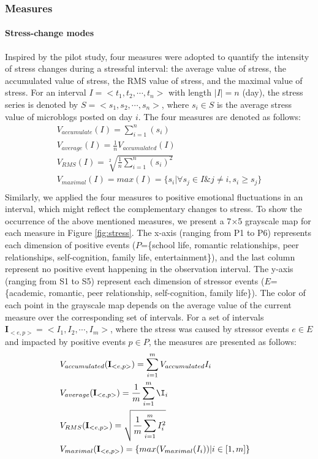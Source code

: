 \subsubsection{Measures}
\label{subsubM}
\paragraph{\textbf{Stress-change modes}}
Inspired by the pilot study,
four measures were adopted to quantify the intensity of stress changes during a stressful interval:
the average value of stress,
the accumulated value of stress,
the RMS value of stress, and the maximal value of stress.
For an interval $I=<t_1,t_2,\cdots,t_n>$ with length $|I|=n$ (day),
the stress series is denoted by $S=<s_1,s_2,\cdots,s_n>$,
where $s_i \in S$ is the average stress value of microblogs posted on day $i$.
The four measures are denoted as follows:
\begin{equation}
\begin{aligned}
&V_{accumulate}(I)= \sum_{i=1}^{n}(s_i)&\\
&V_{average}(I)= \frac{1}{n}V_{accumulated}(I)&\\
&V_{RMS}(I) = \sqrt[2]{ \frac{1}{n}\sum_{i=1}^{n}{(s_i)^2}}&\\
&V_{maximal}(I) = max(I) = \{s_i |\forall s_j \in I \& j \neq i, s_i \geq s_j\}&\\
 \end{aligned}
 \end{equation}
Similarly,
we applied the four measures to positive emotional fluctuations in an interval,
which might reflect the complementary changes to stress.
To show the occurrence of the above mentioned measures,
we present a 7$\times$5 grayscale map for each measure in Figure \ref{fig:stress}.
The x-axis (ranging from P1 to P6) represents each dimension of positive events
($P$=\{school life, romantic relationships, peer relationships, self-cognition, family life, entertainment\}),
and the last column represent no positive event happening in the observation interval.
The y-axis (ranging from S1 to S5) represent each dimension of stressor events
($E$=\{academic, romantic, peer relationship, self-cognition, family life\}).
The color of each point in the grayscale map depends on the average value of the current measure over the corresponding set of intervals.
For a set of intervals $\textbf{I}_{<e,p>} = <I_1,I_2,\cdots,I_m>$,
where the stress was caused by stressor events $e \in E$
and impacted by positive events $p \in P$,
the measures are presented as follows:
\begin{equation}
\begin{aligned}
& V_{accumulated}(\textbf{I}_{<e,p>})=\sum_{i=1}^m{V_{accumulated}I_i}&\\
& V_{average}(\textbf{I}_{<e,p>})=\frac{1}{m}\sum_{i=1}^m\I_i&\\
& V_{RMS}(\textbf{I}_{<e,p>})=\sqrt{\frac{1}{m}\sum_{i=1}^mI_i^2}&\\
& V_{maximal}(\textbf{I}_{<e,p>}) = \{max(V_{maximal}(I_i))|i\in[1,m]\} &
 \end{aligned}
 \end{equation}
